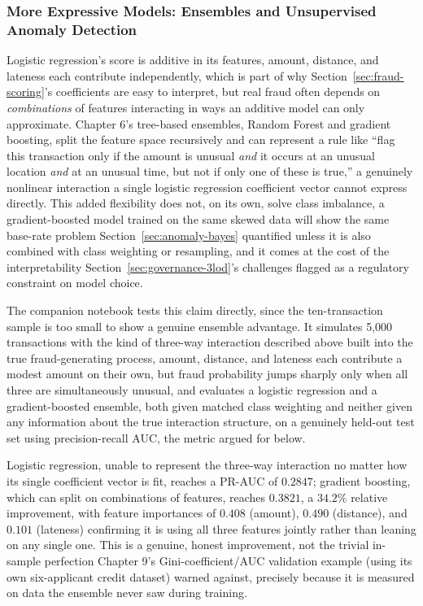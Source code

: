 \documentclass[../ai_in_finance]{subfiles}
\begin{document}
\subsubsection*{More Expressive Models: Ensembles and Unsupervised Anomaly Detection}

Logistic regression's score is additive in its features, amount, distance, and lateness each contribute independently, which is part of why Section~\ref{sec:fraud-scoring}'s coefficients are easy to interpret, but real fraud often depends on \emph{combinations} of features interacting in ways an additive model can only approximate. Chapter 6's tree-based ensembles, Random Forest and gradient boosting, split the feature space recursively and can represent a rule like ``flag this transaction only if the amount is unusual \emph{and} it occurs at an unusual location \emph{and} at an unusual time, but not if only one of these is true,'' a genuinely nonlinear interaction a single logistic regression coefficient vector cannot express directly. This added flexibility does not, on its own, solve class imbalance, a gradient-boosted model trained on the same skewed data will show the same base-rate problem Section~\ref{sec:anomaly-bayes} quantified unless it is also combined with class weighting or resampling, and it comes at the cost of the interpretability Section~\ref{sec:governance-3lod}'s challenges flagged as a regulatory constraint on model choice.

The companion notebook tests this claim directly, since the ten-transaction sample is too small to show a genuine ensemble advantage. It simulates 5,000 transactions with the kind of three-way interaction described above built into the true fraud-generating process, amount, distance, and lateness each contribute a modest amount on their own, but fraud probability jumps sharply only when all three are simultaneously unusual, and evaluates a logistic regression and a gradient-boosted ensemble, both given matched class weighting and neither given any information about the true interaction structure, on a genuinely held-out test set using precision-recall AUC, the metric argued for below.

Logistic regression, unable to represent the three-way interaction no matter how its single coefficient vector is fit, reaches a PR-AUC of $0.2847$; gradient boosting, which can split on combinations of features, reaches $0.3821$, a $34.2\%$ relative improvement, with feature importances of $0.408$ (amount), $0.490$ (distance), and $0.101$ (lateness) confirming it is using all three features jointly rather than leaning on any single one. This is a genuine, honest improvement, not the trivial in-sample perfection Chapter 9's Gini-coefficient/AUC validation example (using its own six-applicant credit dataset) warned against, precisely because it is measured on data the ensemble never saw during training.
\end{document}
